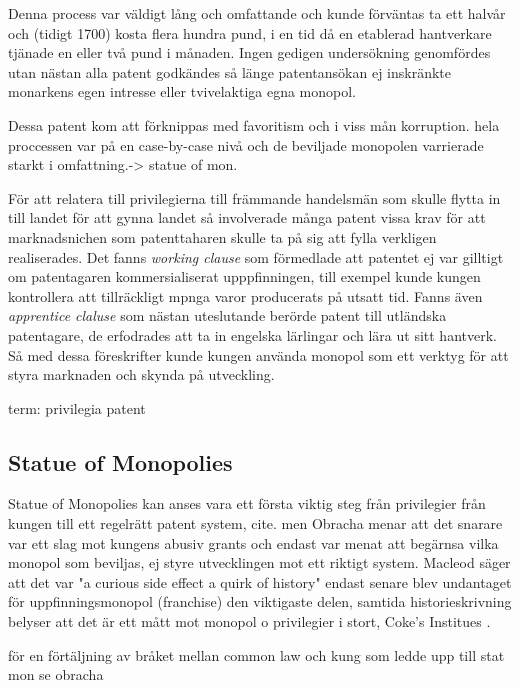 Denna process var väldigt lång och omfattande och kunde
förväntas ta ett halvår och (tidigt 1700) kosta flera hundra pund, i en tid då en etablerad hantverkare tjänade en eller två pund i månaden. \cite{macleod}
Ingen gedigen undersökning genomfördes utan nästan alla patent godkändes så
länge patentansökan ej inskränkte monarkens egen intresse eller tvivelaktiga egna monopol. 

Dessa patent kom att förknippas med favoritism och i viss mån korruption. hela proccessen var på en
case-by-case nivå och de beviljade monopolen varrierade starkt i omfattning.-> statue of mon.

För att relatera till privilegierna till främmande handelsmän som skulle flytta in till landet för att
gynna landet så involverade många patent vissa krav för att marknadsnichen som patenttaharen skulle ta på
sig att fylla verkligen realiserades. Det fanns \emph{working clause} som förmedlade att patentet ej var
gilltigt om patentagaren kommersialiserat upppfinningen, till exempel kunde kungen kontrollera att
tillräckligt mpnga varor producerats på utsatt tid. Fanns även \emph{apprentice claluse} som nästan
uteslutande berörde patent till utländska patentagare, de erfodrades att ta in engelska lärlingar och
lära ut sitt hantverk. Så med dessa föreskrifter kunde kungen använda monopol som ett verktyg för att styra marknaden och skynda på utveckling.\cite{bracha}

term: privilegia patent


\subsection{Statue of Monopolies} %
\label{sub:statue_of_monopolies}

Statue of Monopolies kan anses vara ett första viktig steg från privilegier från kungen till ett
regelrätt patent system, cite. men Obracha menar att det snarare var ett slag mot kungens abusiv grants
och endast var menat att begärnsa vilka monopol som beviljas, ej styre utvecklingen mot ett riktigt
system. Macleod \cite{macleod2} säger att det var "a curious side effect a quirk of history" endast
senare blev undantaget för uppfinningsmonopol (franchise) den viktigaste delen, samtida historieskrivning
belyser att det är ett mått mot monopol o privilegier i stort, Coke's Institues \cite{coke}.

för en förtäljning av bråket mellan common law och kung som ledde upp till stat mon se obracha


